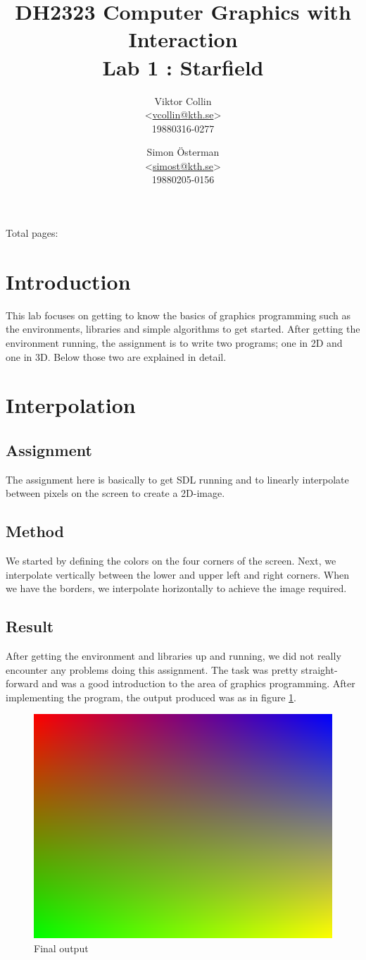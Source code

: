 \documentclass[a4paper,11pt]{article}
\author{Viktor Collin \\ <\url{vcollin@kth.se}> \\ 19880316-0277 \and Simon \"{O}sterman \\ <\url{simost@kth.se}> \\ 19880205-0156}
\title{\textbf{DH2323 Computer Graphics with Interaction \\ Lab 1 : Starfield}}
\begin{document}
\maketitle
\begin{center}
Total pages: \pageref{LastPage}
\end{center}
\thispagestyle{empty}

\clearpage
\setcounter{page}{1}
\section*{Introduction}
This lab focuses on getting to know the basics of graphics programming such as the 
environments, libraries and simple algorithms to get started. After getting the environment running, the assignment is to write two programs; one in 2D and one in 3D. Below those two are explained in detail. 

\section{Interpolation}
\subsection{Assignment}
The assignment here is basically to get SDL running and to linearly interpolate between pixels on the screen to create a 2D-image.

\subsection{Method}
We started by defining the colors on the four corners of the screen. Next, we interpolate vertically between the lower and upper left and right corners. When we have the borders, we interpolate horizontally to achieve the image required. 

\subsection{Result}
After getting the environment and libraries up and running, we did not really encounter any problems doing this assignment. The task was pretty straight-forward and was a good introduction to the area of graphics programming. After implementing the program, the output produced was as in figure \ref{fig1}.
\begin{figure}[h!]
	\centering
	\includegraphics[width=0.75\linewidth]{screenshot1.png}
	\caption{Final output}
	\label{fig1}
\end{figure}
\end{document}
